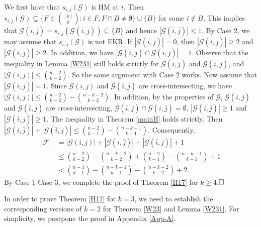 \documentclass[11pt]{article}
\numberwithin{equation}{section}
\begin{document}
We first have that $s_{i, j}(\mathcal{G})$ is HM at $i$.  Then $s_{i,j}(\mathcal{G})\subseteq \big\{F \in\binom{[n]}{k}: i \in F, F \cap B \neq \emptyset\big\} \cup\{B\}$ for some $i\notin B$, 
This implies that
 $\mathcal{G}(\bar{i}, \bar{j})=s_{i,j}(\mathcal{G}(\bar{i}, \bar{j}))\subseteq \{B\}$ and hence $|\mathcal{G}(\bar{i},\bar{j})|\leq 1$. By Case 2, we may assume that $s_{i, j}(\mathcal{G})$ is not EKR. If $|\mathcal{G}(\bar{i},\bar{j})|=0$, then $|\mathcal{G}(i,\bar{j})|\geq 2$ and $|\mathcal{G}(\bar{i},j)|\geq 2$. In addition, we have  $|\mathcal{G}(\bar{i},j)\cap \mathcal{G}(i,\bar{j})|=1$. Observe that the inequality in Lemma \ref{W231} still holds strictly for  $\mathcal{G}(i,\bar{j})$ and $\mathcal{G}(\bar{i},j)$,  and  $|\mathcal{G}(i,j)|\leq \binom{n-2}{k-2}$. So the same argument with Case 2 works. 
Now assume that $|\mathcal{G}(\bar{i},\bar{j})|= 1$.
 Since $\mathcal{G}(i,j)$ and $\mathcal{G}(\bar{i},\bar{j})$ are cross-intersecting, we have
$
|\mathcal{G}(i,j)|\leq \binom{n-2}{k-2}-\binom{n-k-2}{k-2}.
$
In addition, by the properties of $\mathcal{G}$, $\mathcal{G}(i,\bar{j})$ and $\mathcal{G}(\bar{i},j)$ are cross-intersecting, $\mathcal{G}(\bar{i},j)\cap \mathcal{G}(i,\bar{j})=\emptyset$, $|\mathcal{G}(i,\bar{j})|\geq 1$ and $|\mathcal{G}(\bar{i},j)|\geq 1$.   The inequality in 
Theorem \ref{mainH}  holds strictly. Then 
$
|\mathcal{G}(i,\bar{j})|+|\mathcal{G}(\bar{i}, j)|\leq \binom{n-2}{k-1}-\binom{n-k-1}{k-1}$.
Consequently,
\begin{align*}
|\mathcal{F}|&=|\mathcal{G}(i,j)|+|\mathcal{G}(i,\bar{j})|+|\mathcal{G}(\bar{i}, j)|+1 \\ 
& \leq \binom{n-2}{k-2}-\binom{n-k-2}{k-2}+\binom{n-2}{k-1}-\binom{n-k-1}{k-1}+1\\
&<\binom{n-1}{k-1}-\binom{n-k-1}{k-1}-\binom{n-k-2}{k-2}+2.
\end{align*}
By Case 1-Case 3, we complete the proof of Theorem \ref{H17} for $k\geq 4$.$\hfill \square$\vspace{3mm}

In order to prove Theorem \ref{H17} for $k=3$, we need to establish the corresponding versions of $k=2$ for Theorem \ref{W23} and Lemma \ref{W231}. 
For simplicity, we postpone the proof in Appendix \ref{App-A}. 
\end{document}
